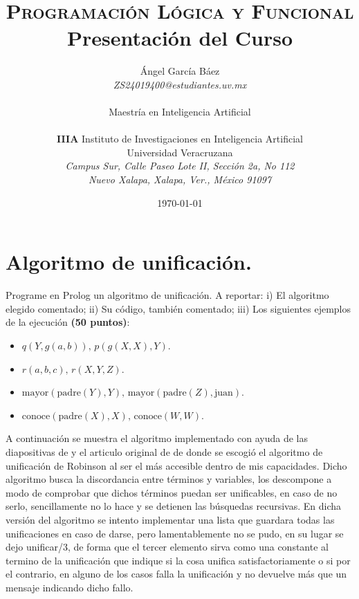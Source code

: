 \documentclass[11pt, letterpaper]{article}
\title{\textsc{Programación Lógica y Funcional} \\
  Presentación del Curso}
\author{Ángel García Báez \\ \emph{ZS24019400@estudiantes.uv.mx} \\ \\
  Maestría en Inteligencia Artificial \\ \\ \textbf{IIIA}
  Instituto de Investigaciones en Inteligencia Artificial \\
  Universidad Veracruzana \\ \emph{Campus Sur, Calle Paseo Lote II,
    Sección 2a, No 112} \\ \emph{Nuevo Xalapa, Xalapa, Ver., México 91097}}
\date{\today}
\begin{document}
\maketitle

\newpage

\section{Algoritmo de unificación.}

Programe en Prolog un algoritmo de unificación. A reportar: i) El algoritmo elegido comentado; ii) Su código, también comentado; iii) Los siguientes ejemplos de la ejecución \textbf{(50 puntos)}: 

\begin{itemize}
    \item $q(Y, g(a, b)), \, p(g(X, X), Y)$.
    \item $r(a, b, c), \, r(X, Y, Z)$.
    \item $\text{mayor}(\text{padre}(Y), Y), \, \text{mayor}(\text{padre}(Z), \text{juan})$.
    \item $\text{conoce}(\text{padre}(X), X), \, \text{conoce}(W, W)$.
\end{itemize}

A continuación se muestra el algoritmo implementado con ayuda de las diapositivas de \cite{guerra2024} y el articulo original de \cite{k89} de donde se escogió el algoritmo de unificación de Robinson al ser el más accesible dentro de mis capacidades. Dicho algoritmo busca la discordancia entre términos y variables, los descompone a modo de comprobar que dichos términos puedan ser unificables, en caso de no serlo, sencillamente no lo hace y se detienen las búsquedas recursivas. En dicha versión del algoritmo se intento implementar una lista que guardara todas las unificaciones en caso de darse, pero lamentablemente no se pudo, en su lugar se dejo  unificar/3, de forma que el tercer elemento sirva como una constante al termino de la unificación que indique si la cosa unifica satisfactoriamente o si por el contrario, en alguno de los casos falla la unificación y no devuelve más que un mensaje indicando dicho fallo.
\end{document}
